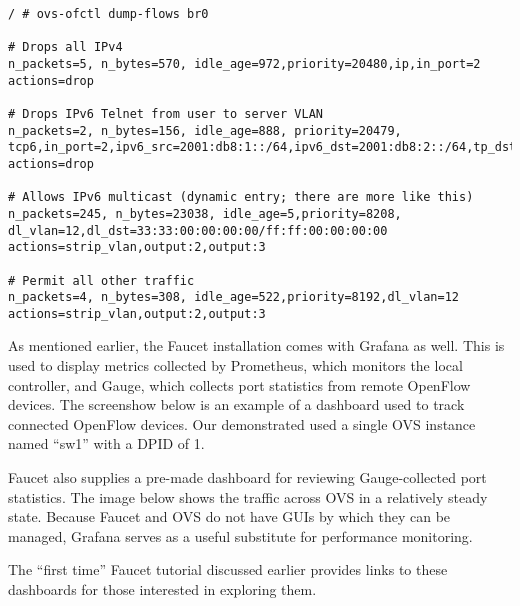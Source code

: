 \begin{verbatim}
/ # ovs-ofctl dump-flows br0

# Drops all IPv4
n_packets=5, n_bytes=570, idle_age=972,priority=20480,ip,in_port=2
actions=drop

# Drops IPv6 Telnet from user to server VLAN
n_packets=2, n_bytes=156, idle_age=888, priority=20479,
tcp6,in_port=2,ipv6_src=2001:db8:1::/64,ipv6_dst=2001:db8:2::/64,tp_dst=23
actions=drop

# Allows IPv6 multicast (dynamic entry; there are more like this)
n_packets=245, n_bytes=23038, idle_age=5,priority=8208,
dl_vlan=12,dl_dst=33:33:00:00:00:00/ff:ff:00:00:00:00
actions=strip_vlan,output:2,output:3

# Permit all other traffic
n_packets=4, n_bytes=308, idle_age=522,priority=8192,dl_vlan=12
actions=strip_vlan,output:2,output:3
\end{verbatim}

As mentioned earlier, the Faucet installation comes with Grafana as well.
This is used to display metrics collected by Prometheus, which monitors
the local controller, and Gauge, which collects port statistics from
remote OpenFlow devices. The screenshow below is an example of a
dashboard used to track connected OpenFlow devices. Our demonstrated
used a single OVS instance named ``sw1'' with a DPID of 1.


Faucet also supplies a pre-made dashboard for reviewing Gauge-collected
port statistics. The image below shows the traffic across OVS in a relatively
steady state. Because Faucet and OVS do not have GUIs by which they can
be managed, Grafana serves as a useful substitute for performance monitoring.


The ``first time'' Faucet tutorial discussed earlier provides links to these
dashboards for those interested in exploring them.
